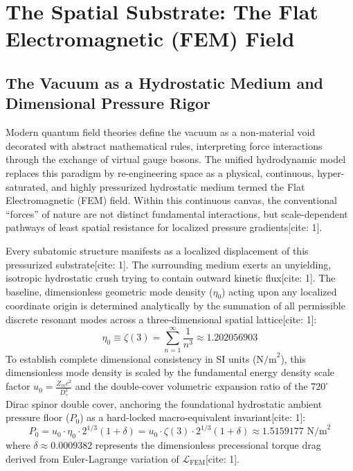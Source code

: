 \documentclass[11pt,a4paper]{article}
\begin{document}
	\clearpage
	\tableofcontents
	\clearpage
	
	\section{The Spatial Substrate: The Flat Electromagnetic (FEM) Field}
	
	\subsection{The Vacuum as a Hydrostatic Medium and Dimensional Pressure Rigor}
	Modern quantum field theories define the vacuum as a non-material void decorated with abstract mathematical rules, interpreting force interactions through the exchange of virtual gauge bosons. The unified hydrodynamic model replaces this paradigm by re-engineering space as a physical, continuous, hyper-saturated, and highly pressurized hydrostatic medium termed the Flat Electromagnetic (FEM) field. Within this continuous canvas, the conventional ``forces'' of nature are not distinct fundamental interactions, but scale-dependent pathways of least spatial resistance for localized pressure gradients[cite: 1].
	
	Every subatomic structure manifests as a localized displacement of this pressurized substrate[cite: 1]. The surrounding medium exerts an unyielding, isotropic hydrostatic crush trying to contain outward kinetic flux[cite: 1]. The baseline, dimensionless geometric mode density ($\eta_0$) acting upon any localized coordinate origin is determined analytically by the summation of all permissible discrete resonant modes across a three-dimensional spatial lattice[cite: 1]:
	\begin{equation}
		\eta_0 \equiv \zeta(3) = \sum_{n=1}^{\infty} \frac{1}{n^3} \approx 1.202056903
	\end{equation}
	To establish complete dimensional consistency in SI units ($\text{N/m}^2$), this dimensionless mode density is scaled by the fundamental energy density scale factor $u_0 = \frac{Z_m c^2}{D_\gamma^3}$ and the double-cover volumetric expansion ratio of the $720^\circ$ Dirac spinor double cover, anchoring the foundational hydrostatic ambient pressure floor ($P_0$) as a hard-locked macro-equivalent invariant[cite: 1]:
	\begin{equation}
		P_0 = u_0 \cdot \eta_0 \cdot 2^{1/3} (1 + \delta) = u_0 \cdot \zeta(3) \cdot 2^{1/3} (1 + \delta) \approx 1.5159177 \text{ N/m}^2
	\end{equation}
	where $\delta \approx 0.0009382$ represents the dimensionless precessional torque drag derived from Euler-Lagrange variation of $\mathcal{L}_{\text{FEM}}$[cite: 1].
	
\end{document}
